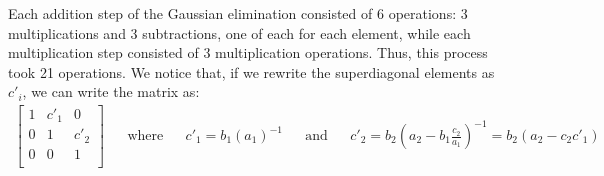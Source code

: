 Each addition step of the Gaussian elimination consisted of 6 operations: 3 multiplications and 3 subtractions, one of each for each element, while each multiplication step consisted of 3 multiplication operations. Thus, this process took 21 operations. %
We notice that, if we rewrite the superdiagonal elements as $c'_i$, we can write the matrix as:
\begin{align*}
    \begin{bmatrix}
        1 & c'_1 & 0 \\
        0 & 1 & c'_2 \\
        0 & 0 & 1 \\
    \end{bmatrix} & & \text{where} & & c'_1 = b_1\left(a_1\right)^{-1} & & \text{and} & & c'_2 = b_2\left(a_2 - b_1\frac{c_2}{a_1}\right)^{-1} = b_2(a_2 - c_2c'_1) \\
\end{align*}

